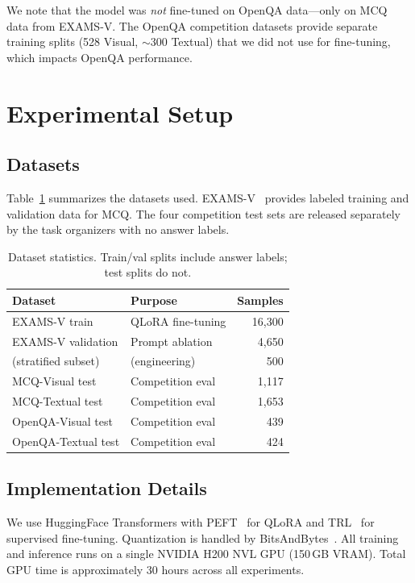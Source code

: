 \documentclass[]{ceurart}
\begin{document}
We note that the model was \textit{not} fine-tuned on OpenQA data---only on MCQ data from EXAMS-V.
The OpenQA competition datasets provide separate training splits (528 Visual, $\sim$300 Textual) that we did not use for fine-tuning, which impacts OpenQA performance.

\section{Experimental Setup}
\label{sec:setup}

\subsection{Datasets}
\label{sec:datasets}

Table~\ref{tab:datasets} summarizes the datasets used.
EXAMS-V~\cite{examsv} provides labeled training and validation data for MCQ.
The four competition test sets are released separately by the task organizers with no answer labels.

\begin{table}[t]
\centering
\caption{Dataset statistics. Train/val splits include answer labels; test splits do not.}
\label{tab:datasets}
\begin{tabular}{llr}
\toprule
\textbf{Dataset} & \textbf{Purpose} & \textbf{Samples} \\
\midrule
EXAMS-V train      & QLoRA fine-tuning    & 16,300 \\
EXAMS-V validation & Prompt ablation      & 4,650 \\
\quad (stratified subset) & \quad (engineering)  & 500 \\
\midrule
MCQ-Visual test    & Competition eval     & 1,117 \\
MCQ-Textual test   & Competition eval     & 1,653 \\
OpenQA-Visual test & Competition eval     & 439 \\
OpenQA-Textual test & Competition eval    & 424 \\
\bottomrule
\end{tabular}
\end{table}

\subsection{Implementation Details}
\label{sec:implementation}

We use HuggingFace Transformers with PEFT~\cite{peft} for QLoRA and TRL~\cite{trl} for supervised fine-tuning.
Quantization is handled by BitsAndBytes~\cite{bitsandbytes}.
All training and inference runs on a single NVIDIA H200 NVL GPU (150\,GB VRAM).
Total GPU time is approximately 30 hours across all experiments.
\end{document}
